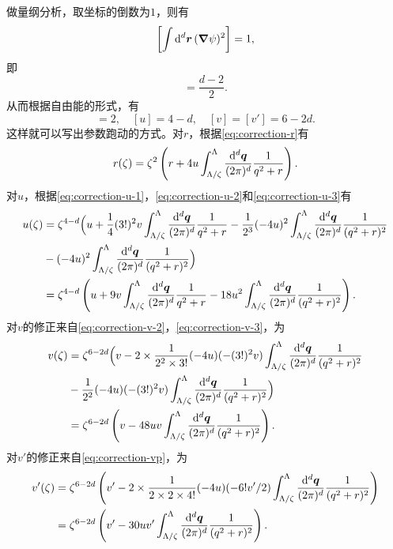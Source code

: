 \documentclass[hyperref, UTF8, a4paper]{ctexart}
\begin{document}
做量纲分析，取坐标的倒数为$1$，则有
\[
    \left[ \int \dd[d]{\vb*{r}} (\grad{\psi})^2 \right] = 1,
\]
即
\begin{equation}
    [\psi] = \frac{d-2}{2}.
\end{equation}
从而根据自由能的形式，有
\begin{equation}
    [r] = 2, \quad [u] = 4 - d, \quad [v] = [v'] = 6 - 2d.
\end{equation}
这样就可以写出参数跑动的方式。对$r$，根据\eqref{eq:correction-r}有
\begin{equation}
    r(\zeta) = \zeta^2 \left( r + 4 u \int_{\Lambda/\zeta}^\Lambda \frac{\dd[d]{\vb*{q}}}{(2\pi)^d} \frac{1}{q^2+r} \right).
\end{equation}
对$u$，根据\eqref{eq:correction-u-1}，\eqref{eq:correction-u-2}和\eqref{eq:correction-u-3}有
\begin{equation}
    \begin{aligned}
        u(\zeta) &= \zeta^{4-d} \Bigl( u + \frac{1}{4} (3!)^2 v \int_{\Lambda / \zeta}^\Lambda \frac{\dd[d]{\vb*{q}}}{(2\pi)^d} \frac{1}{q^2 + r} - \frac{1}{2^3} (-4u)^2 \int_{\Lambda / \zeta}^\Lambda \frac{\dd[d]{\vb*{q}}}{(2\pi)^d} \frac{1}{(q^2 + r)^2} \\
        &- (-4u)^2 \int_{\Lambda / \zeta}^\Lambda \frac{\dd[d]{\vb*{q}}}{(2\pi)^d} \frac{1}{(q^2 + r)^2} \Bigl) \\
        &= \zeta^{4-d} \left( u + 9 v \int_{\Lambda / \zeta}^\Lambda \frac{\dd[d]{\vb*{q}}}{(2\pi)^d} \frac{1}{q^2 + r} - 18 u^2 \int_{\Lambda / \zeta}^\Lambda \frac{\dd[d]{\vb*{q}}}{(2\pi)^d} \frac{1}{(q^2 + r)^2} \right).
    \end{aligned}
\end{equation}
对$v$的修正来自\eqref{eq:correction-v-2}，\eqref{eq:correction-v-3}，为
\begin{equation}
    \begin{aligned}
        v(\zeta) &= \zeta^{6-2d} \Bigl( v - 2 \times \frac{1}{2^2 \times 3!} (-4 u)(-(3!)^2 v) \int^\Lambda_{\Lambda/\zeta} \frac{\dd[d]{\vb*{q}}}{(2\pi)^d} \frac{1}{(q^2+r)^2} \\
        &- \frac{1}{2^2} (-4 u)(-(3!)^2 v) \int^\Lambda_{\Lambda/\zeta} \frac{\dd[d]{\vb*{q}}}{(2\pi)^d} \frac{1}{(q^2+r)^2} \Bigl) \\
        &= \zeta^{6-2d} \left( v - 48 u v \int^\Lambda_{\Lambda/\zeta} \frac{\dd[d]{\vb*{q}}}{(2\pi)^d} \frac{1}{(q^2+r)^2} \right).
    \end{aligned}
\end{equation}
对$v'$的修正来自\eqref{eq:correction-vp}，为
\begin{equation}
    \begin{aligned}
        v'(\zeta) &= \zeta^{6-2d} \left( v' - 2 \times \frac{1}{2 \times 2 \times 4!} (-4 u)(-6! v'/2) \int_{\Lambda / \zeta}^\Lambda \frac{\dd[d]{\vb*{q}}}{(2\pi)^d} \frac{1}{(q^2 + r)^2} \right) \\
        &= \zeta^{6-2d} \left( v' - 30 u v' \int_{\Lambda / \zeta}^\Lambda \frac{\dd[d]{\vb*{q}}}{(2\pi)^d} \frac{1}{(q^2 + r)^2} \right).
    \end{aligned}
\end{equation}
\end{document}
